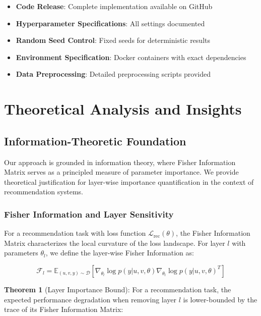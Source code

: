 \documentclass[10pt,conference]{IEEEtran}
\newcommand{\fisher}{\mathcal{F}}
\newcommand{\loss}{\mathcal{L}}
\begin{document}
\begin{itemize}[leftmargin=*]
    \item \textbf{Code Release}: Complete implementation available on GitHub
    \item \textbf{Hyperparameter Specifications}: All settings documented
    \item \textbf{Random Seed Control}: Fixed seeds for deterministic results
    \item \textbf{Environment Specification}: Docker containers with exact dependencies
    \item \textbf{Data Preprocessing}: Detailed preprocessing scripts provided
\end{itemize}

\section{Theoretical Analysis and Insights}

\subsection{Information-Theoretic Foundation}

Our approach is grounded in information theory, where Fisher Information Matrix serves as a principled measure of parameter importance. We provide theoretical justification for layer-wise importance quantification in the context of recommendation systems.

\subsubsection{Fisher Information and Layer Sensitivity}

For a recommendation task with loss function $\loss_{\text{rec}}(\theta)$, the Fisher Information Matrix characterizes the local curvature of the loss landscape. For layer $l$ with parameters $\theta_l$, we define the layer-wise Fisher Information as:

\begin{equation}
\fisher_l = \mathbb{E}_{(u,v,y) \sim \mathcal{D}}\left[\nabla_{\theta_l} \log p(y|u,v,\theta) \nabla_{\theta_l} \log p(y|u,v,\theta)^T\right]
\end{equation}

\textbf{Theorem 1} (Layer Importance Bound): For a recommendation task, the expected performance degradation when removing layer $l$ is lower-bounded by the trace of its Fisher Information Matrix:
\end{document}
